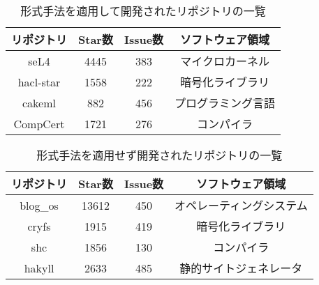 \begin{table}[p]
	\centering
	\caption{形式手法を適用して開発されたリポジトリの一覧}
	\label{tab:repository_formal}
	\begin{tabular}{cccc} %
		\hline
		リポジトリ & Star数 & Issue数 & ソフトウェア領域   \\\hline
		seL4       & 4445   & 383     & マイクロカーネル   \\
		hacl-star  & 1558   & 222     & 暗号化ライブラリ   \\
		cakeml     & 882    & 456     & プログラミング言語 \\
		CompCert   & 1721   & 276     & コンパイラ         \\\hline
	\end{tabular}
\end{table}

\begin{table}[p]
	\centering
	\caption{形式手法を適用せず開発されたリポジトリの一覧}
	\label{tab:repository_common}
	\begin{tabular}{cccc} %
		\hline
		リポジトリ & Star数 & Issue数 & ソフトウェア領域         \\\hline
		blog\_os   & 13612  & 450     & オペレーティングシステム \\
		cryfs      & 1915   & 419     & 暗号化ライブラリ         \\
		shc        & 1856   & 130     & コンパイラ               \\
		hakyll     & 2633   & 485     & 静的サイトジェネレータ   \\\hline
	\end{tabular}
\end{table}



